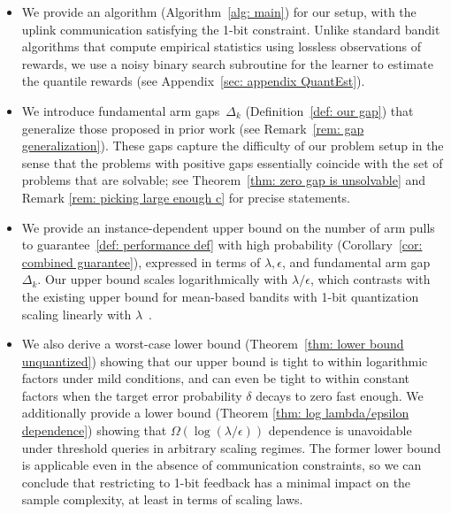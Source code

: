 \begin{itemize}[topsep=0pt, itemsep=0pt]
    \item We provide an algorithm (Algorithm~\ref{alg: main}) for our setup, with the uplink communication satisfying the 1-bit constraint. Unlike standard bandit algorithms that compute empirical statistics using lossless observations of rewards, we use a noisy binary search subroutine for the learner to estimate the quantile rewards (see Appendix~\ref{sec: appendix QuantEst}).
    
    \item  We introduce fundamental arm gaps~$\Delta_k$ (Definition~\ref{def: our gap}) that generalize those proposed in prior work (see Remark~\ref{rem: gap generalization}). These gaps capture the
    difficulty of our problem setup in the sense that the problems with positive gaps essentially coincide with the set of problems that are solvable; see Theorem~\ref{thm: zero gap is unsolvable} and Remark \ref{rem: picking large enough c} for precise statements.

    \item We provide an instance-dependent upper bound on the number of arm pulls to guarantee~\eqref{def: performance def} with high probability (Corollary~\ref{cor: combined guarantee}), expressed in terms of $\lambda, \epsilon$, and fundamental arm gap~$\Delta_k$.
    Our upper bound scales logarithmically with $\lambda/\epsilon$, which contrasts with the existing upper bound for mean-based bandits with 1-bit quantization scaling linearly with $\lambda$~\cite{vial2020one, hanna2022solving}.
    

    \item  We also derive a worst-case lower bound (Theorem~\ref{thm: lower bound unquantized}) showing that our upper bound is tight to within logarithmic factors under mild conditions, and can even be tight to within constant factors when the target error probability $\delta$ decays to zero fast enough.  We additionally provide a lower bound (Theorem \ref{thm: log lambda/epsilon dependence}) showing that $\Omega(\log(\lambda/ \epsilon))$ dependence is unavoidable under threshold queries in arbitrary scaling regimes.  
    The former lower bound is applicable even in the absence of communication constraints, so we can conclude that restricting to 1-bit feedback has a minimal impact on the sample complexity, at least in terms of scaling laws.

\end{itemize}